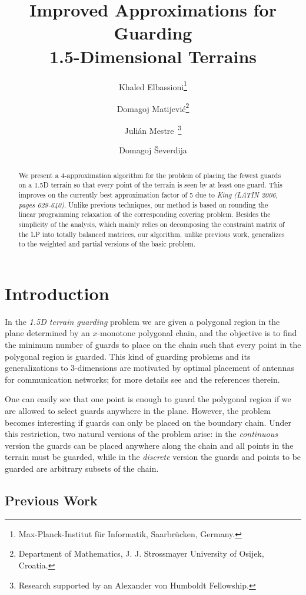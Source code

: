 \documentclass[11pt]{article}
\title{Improved Approximations for Guarding \\ 1.5-Dimensional Terrains }
\author{Khaled Elbassioni\thanks{Max-Planck-Institut f\"ur
	Informatik, Saarbr\"ucken, Germany.}
        \and
        Domagoj Matijevi\'c\thanks{Department of Mathematics,
		J. J. Strossmayer University of Osijek, Croatia.}
		\and
		Juli\'{a}n Mestre\footnotemark[1]\ \thanks{Research supported by an
                  Alexander von Humboldt Fellowship.}
    \and
		Domagoj \v{S}everdija\footnotemark[2]
}
\date{}
\begin{document}
\maketitle


\begin{abstract}
  We present a 4-approximation algorithm for the problem of placing the fewest
  guards on a 1.5D terrain so that every point of the terrain is seen by at
  least one guard.  This improves on the currently best approximation factor
  of 5 due to {\it King (LATIN 2006, pages 629-640)}. Unlike previous
  techniques, our method is based on rounding the linear programming
  relaxation of the corresponding covering problem. Besides the simplicity of
  the analysis, which mainly relies on decomposing the constraint matrix of
  the LP into totally balanced matrices, our algorithm, unlike previous work,
  generalizes to the weighted and partial versions of the basic problem.
\end{abstract}




\section{Introduction}
\label{sec:introduction}

In the \emph{1.5D terrain guarding} problem we are given a polygonal region in
the plane determined by an $x$-monotone polygonal chain, and the objective is
to find the minimum number of guards to place on the chain such that every
point in the polygonal region is guarded. This kind of guarding problems and
its generalizations to 3-dimensions are motivated by optimal placement of
antennas for communication networks; for more details see
\cite{conf/cccg/ChenEU95,journals/siamcomp/Ben-MosheKM07} and the references
therein.

One can easily see that one point is enough to guard the polygonal region if
we are allowed to select guards anywhere in the plane. However, the problem
becomes interesting if guards can only be placed on the boundary chain. Under
this restriction, two natural versions of the problem arise: in the
\emph{continuous} version the guards can be placed anywhere along the chain
and all points in the terrain must be guarded, while in the \emph{discrete}
version the guards and points to be guarded are arbitrary subsets of the
chain.

\subsection{Previous Work}
\label{sec:prev-work}
\end{document}
